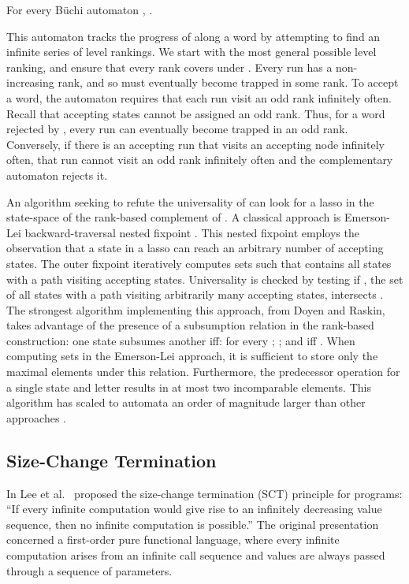 \documentclass{LMCS}
\newcommand\buchi{B\"uchi }
\begin{document}
\begin{lem}\label{KV_Complement}{\rm \cite{KV01}}
For every \buchi automaton , .
\end{lem}

This automaton tracks the progress of  along a word  by
attempting to find an infinite series  of level rankings. We start
with the most general possible level ranking, and ensure that every rank 
covers  under . Every run has a non-increasing rank, and so must
eventually become trapped in some rank. To accept a word, the automaton requires
that each run visit an odd rank infinitely often. Recall that accepting states
cannot be assigned an odd rank. Thus, for a word rejected by , every run can
eventually become trapped in an odd rank.  Conversely, if there is an accepting
run that visits an accepting node infinitely often, that run cannot visit an odd
rank infinitely often and the complementary automaton rejects it.

An algorithm seeking to refute the universality of  can look for a lasso in the state-space of
the rank-based complement of . A classical approach is Emerson-Lei backward-traversal nested
fixpoint  \cite{EL86}.  This nested fixpoint employs
the observation that a state in a lasso can reach an arbitrary number of accepting states. The outer
fixpoint iteratively computes sets  such that  contains all states with a path
visiting  accepting states.  Universality is checked by testing if , the set of all
states with a path visiting arbitrarily many accepting states, intersects .  The strongest
algorithm implementing this approach, from Doyen and Raskin, takes advantage of the presence of a
subsumption relation in the rank-based construction: one state  subsumes another
 iff:  for every ; ; and 
iff .  When computing sets in the Emerson-Lei approach, it is sufficient to store
only the maximal elements under this relation. Furthermore, the predecessor operation for a single
state and letter results in at most two incomparable elements. This algorithm has scaled to automata
an order of magnitude larger than other approaches \cite{DR07}. 


\subsection{Size-Change Termination}\label{SCT}

In \cite{LJB01} Lee et al.~ proposed the size-change termination (SCT)
principle for programs: ``If every infinite computation would give rise to an infinitely
decreasing value sequence, then no infinite computation is possible.'' The
original presentation concerned a first-order pure functional language,
where every infinite computation arises from an infinite call sequence and
values are always passed through a sequence of parameters.
\end{document}
